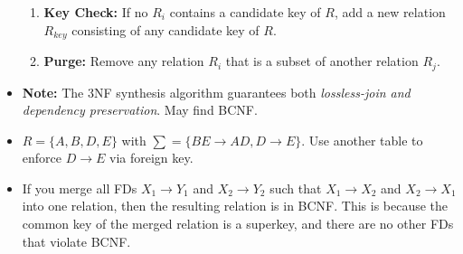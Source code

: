 \documentclass[10pt, landscape]{article}
\begin{document}
\begin{multicols*}{4}
\begin{itemize}
\begin{enumerate}
        \item \textbf{Key Check:} If no $R_i$ contains a candidate key of $R$, add a new relation $R_{key}$ consisting of any candidate key of $R$.
        \item \textbf{Purge:} Remove any relation $R_i$ that is a subset of another relation $R_j$.
    \end{enumerate}
     \item \textbf{Note:} The 3NF synthesis algorithm guarantees both \textit{lossless-join and dependency preservation}. May find BCNF.
     \item $R = \{ A, B, D, E\}$ with $\sum = \{ BE \rightarrow AD, D \rightarrow E \}$. Use another table to enforce $D \rightarrow E$ via foreign key.
     \item If you merge all FDs $X_1 \rightarrow Y_1$ and $X_2 \rightarrow Y_2$ such that $X_1 \rightarrow X_2$ and $X_2 \rightarrow X_1$ into one relation, then the resulting relation is in BCNF. This is because the common key of the merged relation is a superkey, and there are no other FDs that violate BCNF.
\end{itemize}

\end{multicols*}
\end{document}
